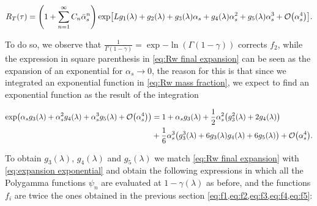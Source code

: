 \documentclass[../Tesi_Jiahao_Miao_986136.tex]{subfiles}
\begin{document}
\begin{equation}\label{eq:RT_resummed}
    R_T(\tau) = \qty(1 + \sum_{n=1}^{\infty} C_n \bar{\alpha}_s^n)\exp[L g_1(\lambda)  + g_2(\lambda) + g_3(\lambda) \alpha_s + g_4(\lambda) \alpha_s^2 + g_5(\lambda) \alpha_s^3 + \order{\alpha_s^4}].
\end{equation}

To do so, we observe that $\frac{1}{\Gamma(1-\gamma)}= \exp{-\ln(\Gamma(1-\gamma))}$ corrects $f_2$, while the expression in square parenthesis in \cref{eq:Rw final expansion} can be seen 
as the expansion of an exponential for $\alpha_s \to 0$, the reason for this is that since we integrated an exponential function in \cref{eq:Rw mass fraction}, we 
expect to find an exponential function as the result of the integration

\begin{equation}
    \begin{split}\label{eq:expansion exponential}
    \exp(\alpha_s g_3(\lambda) + \alpha_s^2 g_4(\lambda) + \alpha_s^3 g_5(\lambda) + \order{\alpha_s^4}) &= 1+\alpha_s g_3(\lambda)+\frac{1}{2} \alpha_s^2 \qty(g_3^2(\lambda)+2 g_4(\lambda))\\
    &+\frac{1}{6} \alpha_s^3 \qty(g_3^3(\lambda) + 6 g_3(\lambda) g_4(\lambda) + 6 g_5(\lambda))+ \order{\alpha_s^4}.
    \end{split}
\end{equation}

To obtain $g_3(\lambda)$, $g_4(\lambda)$ and $g_5(\lambda)$ we match \cref{eq:Rw final expansion} with \cref{eq:expansion exponential} and obtain the following expressions in which all 
the Polygamma functions $\psi_n$ are evaluated at $1-\gamma(\lambda)$ as before, and the functions $f_i$ are twice the ones obtained in the previous section \cref{eq:f1,eq:f2,eq:f3,eq:f4,eq:f5}: 
\end{document}
